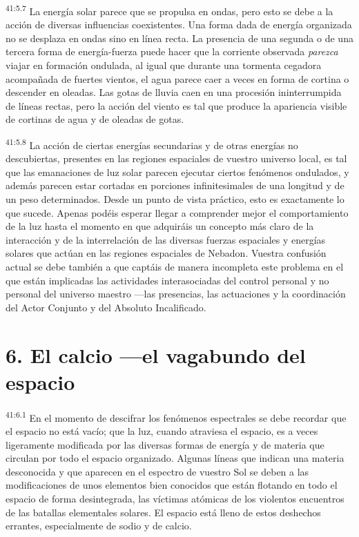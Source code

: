 \par
\textsuperscript{41:5.7} La energía solar parece que se propulsa en ondas, pero esto se debe a la acción de diversas influencias coexistentes. Una forma dada de energía organizada no se desplaza en ondas sino en línea recta. La presencia de una segunda o de una tercera forma de energía-fuerza puede hacer que la corriente observada \textit{parezca} viajar en formación ondulada, al igual que durante una tormenta cegadora acompañada de fuertes vientos, el agua parece caer a veces en forma de cortina o descender en oleadas. Las gotas de lluvia caen en una procesión ininterrumpida de líneas rectas, pero la acción del viento es tal que produce la apariencia visible de cortinas de agua y de oleadas de gotas.

\par
\textsuperscript{41:5.8} La acción de ciertas energías secundarias y de otras energías no descubiertas, presentes en las regiones espaciales de vuestro universo local, es tal que las emanaciones de luz solar parecen ejecutar ciertos fenómenos ondulados, y además parecen estar cortadas en porciones infinitesimales de una longitud y de un peso determinados. Desde un punto de vista práctico, esto es exactamente lo que sucede. Apenas podéis esperar llegar a comprender mejor el comportamiento de la luz hasta el momento en que adquiráis un concepto más claro de la interacción y de la interrelación de las diversas fuerzas espaciales y energías solares que actúan en las regiones espaciales de Nebadon. Vuestra confusión actual se debe también a que captáis de manera incompleta este problema en el que están implicadas las actividades interasociadas del control personal y no personal del universo maestro ---las presencias, las actuaciones y la coordinación del Actor Conjunto y del Absoluto Incalificado.

\section*{6. El calcio ---el vagabundo del espacio}
\par
\textsuperscript{41:6.1} En el momento de descifrar los fenómenos espectrales se debe recordar que el espacio no está vacío; que la luz, cuando atraviesa el espacio, es a veces ligeramente modificada por las diversas formas de energía y de materia que circulan por todo el espacio organizado. Algunas líneas que indican una materia desconocida y que aparecen en el espectro de vuestro Sol se deben a las modificaciones de unos elementos bien conocidos que están flotando en todo el espacio de forma desintegrada, las víctimas atómicas de los violentos encuentros de las batallas elementales solares. El espacio está lleno de estos deshechos errantes, especialmente de sodio y de calcio.

